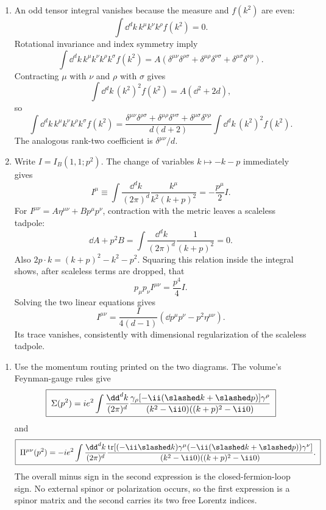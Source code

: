 \begin{enumerate}
\begin{enumerate}
\item
An odd tensor integral vanishes because the measure and \(f(k^2)\) are even:
\[
 \int \dd^dk\,k^\mu k^\nu k^\rho f(k^2)=0.
\]
Rotational invariance and index symmetry imply
\[
 \int \dd^dk\,k^\mu k^\nu k^\rho k^\sigma f(k^2)
 =A(\delta^{\mu\nu}\delta^{\rho\sigma}
 +\delta^{\mu\rho}\delta^{\nu\sigma}
 +\delta^{\mu\sigma}\delta^{\nu\rho}).
\]
Contracting \(\mu\) with \(\nu\) and \(\rho\) with \(\sigma\) gives
\[
 \int \dd^dk\,(k^2)^2f(k^2)=A(\dd^2+2d),
\]
so
\[
 \boxed{\;
 \int \dd^dk\,k^\mu k^\nu k^\rho k^\sigma f(k^2)
 =\frac{\delta^{\mu\nu}\delta^{\rho\sigma}
 +\delta^{\mu\rho}\delta^{\nu\sigma}
 +\delta^{\mu\sigma}\delta^{\nu\rho}}
 {d(d+2)}
 \int \dd^dk\,(k^2)^2f(k^2).
 \;}
\]
The analogous rank-two coefficient is \(\delta^{\mu\nu}/d\).
\item
Write \(I=I_B(1,1;p^2)\).  The change of variables \(k\mapsto-k-p\)
immediately gives
\[
 I^\mu\equiv\int\frac{\dd^dk}{(2\pi)^d}
 \frac{k^\mu}{k^2(k+p)^2}=-\frac{p^\mu}{2}I.
\]
For
\(I^{\mu\nu}=A\eta^{\mu\nu}+Bp^\mu p^\nu\), contraction with the metric
leaves a scaleless tadpole:
\[
 \dd A+p^2B=\int\frac{\dd^dk}{(2\pi)^d}\frac1{(k+p)^2}=0.
\]
Also \(2p\cdot k=(k+p)^2-k^2-p^2\).  Squaring this relation inside the
integral shows, after scaleless terms are dropped, that
\[
 p_\mu p_\nu I^{\mu\nu}=\frac{p^4}{4}I.
\]
Solving the two linear equations gives
\[
 \boxed{\;
 I^{\mu\nu}
 =\frac{I}{4(d-1)}
 \left(\dd p^\mu p^\nu-p^2\eta^{\mu\nu}\right).
 \;}
\]
Its trace vanishes, consistently with dimensional regularization of the
scaleless tadpole.
\end{enumerate}

\begin{enumerate}
\item
Use the momentum routing printed on the two diagrams.  The volume's
Feynman-gauge rules give
\[
 \boxed{\;
 \Sigma(p^2)=ie^2\int\frac{\dd^dk}{(2\pi)^d}
 \frac{\gamma_\rho[-\ii(\slashed k+\slashed p)]\gamma^\rho}
 {(k^2-\ii0)((k+p)^2-\ii0)}
 \;}
\]
and
\[
 \boxed{\;
 \Pi^{\mu\nu}(p^2)=-ie^2\int\frac{\dd^dk}{(2\pi)^d}
 \frac{\operatorname{tr}\!\left[
 (-\ii\slashed k)\gamma^\mu
 (-\ii(\slashed k+\slashed p))\gamma^\nu\right]}
 {(k^2-\ii0)((k+p)^2-\ii0)}.
 \;}
\]
The overall minus sign in the second expression is the closed-fermion-loop
sign.  No external spinor or polarization occurs, so the first expression
is a spinor matrix and the second carries its two free Lorentz indices.


\end{enumerate}
\end{enumerate}
